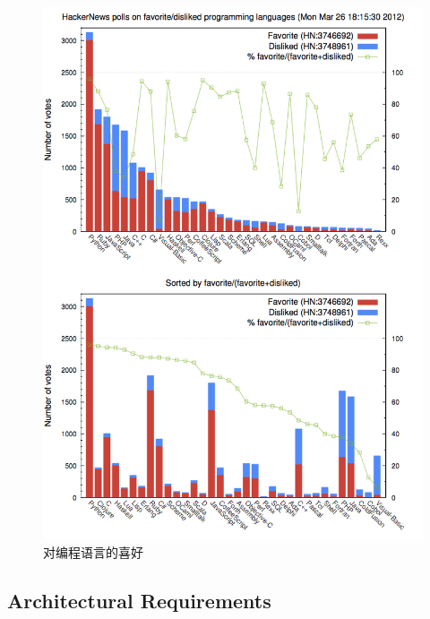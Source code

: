 \documentclass{book}
\begin{document}
\begin{figure}[htbp]
	\centering
	\includegraphics[scale=0.8]{YourFavoriteDislikeProgramLanguage.png}
	\caption{对编程语言的喜好}
	\label{fig:YourFavoriteDislikeProgramLanguage}
\end{figure}



\subsection{Architectural Requirements}
\end{document}

